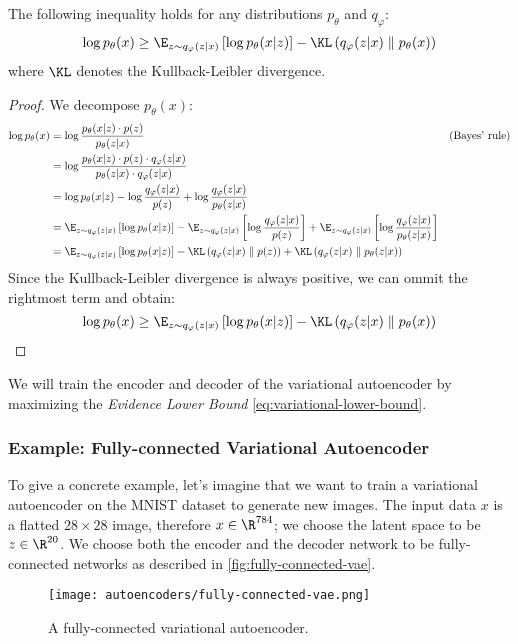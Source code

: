 \begin{property}
    The following inequality holds for any distributions $p_\theta$ and $q_\varphi$:
    \begin{equation}
        \label{eq:variational-lower-bound}
        \log p_\theta(x) \geq \E_{z\sim q_\varphi(z|x)}\left[\log p_\theta(x|z)\right] - \KL\left(q_\varphi(z|x)\parallel p_\theta(x)\right)
    \end{equation}
    where $\KL$ denotes the Kullback-Leibler divergence.
\end{property}
\begin{proof}
    We decompose $p_\theta(x)$:
    \begin{align*}
        \log p_\theta(x) &= \log\frac{p_\theta(x|z)\cdot p(z)}{p_\theta(z|x)} && \text{(Bayes' rule)} \\
        &= \log\frac{p_\theta(x|z)\cdot p(z)\cdot q_\varphi(z|x)}{p_\theta(z|x)\cdot q_\varphi(z|x)} \\
        &= \log p_\theta(x|z) - \log\frac{q_\varphi(z|x)}{p(z)} + \log\frac{q_\varphi(z|x)}{p_\theta(z|x)} \\
        &= \E_{z\sim q_\varphi(z|x)}\left[\log p_\theta(x|z)\right] - \E_{z\sim q_\varphi(z|x)}\left[\log\frac{q_\varphi(z|x)}{p(z)}\right] + \E_{z\sim q_\varphi(z|x)}\left[\log\frac{q_\varphi(z|x)}{p_\theta(z|x)}\right] \\
        &= \E_{z\sim q_\varphi(z|x)}\left[\log p_\theta(x|z)\right] - \KL\left(q_\varphi(z|x)\parallel p(z)\right) + \KL\left(q_\varphi(z|x)\parallel p_\theta(z|x)\right)
    \end{align*}
    Since the Kullback-Leibler divergence is always positive, we can ommit the rightmost term and obtain:
    \begin{equation*}
        \log p_\theta(x) \geq \E_{z\sim q_\varphi(z|x)}\left[\log p_\theta(x|z)\right] - \KL\left(q_\varphi(z|x)\parallel p_\theta(x)\right)
    \end{equation*}
\end{proof}

We will train the encoder and decoder of the variational autoencoder by maximizing the \emph{Evidence Lower Bound} \autoref{eq:variational-lower-bound}.

\subsubsection{Example: Fully-connected Variational Autoencoder}
To give a concrete example, let's imagine that we want to train a variational autoencoder on the MNIST dataset to generate new images. The input data $x$ is a flatted $28\times28$ image, therefore $x\in\R^{784}$; we choose the latent space to be $z\in\R^{20}$. We choose both the encoder and the decoder network to be fully-connected networks as described in \autoref{fig:fully-connected-vae}.
\begin{figure}[H]
    \centering
    \texttt{[image: autoencoders/fully-connected-vae.png]}
    \caption{A fully-connected variational autoencoder.}
    \label{fig:fully-connected-vae}
\end{figure}

